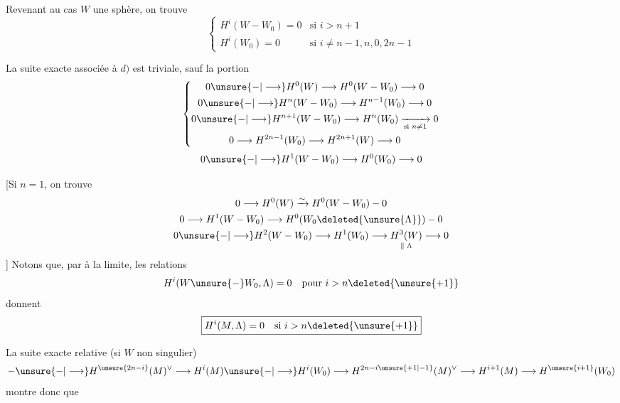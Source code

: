 Revenant au cas $W$ une sphère, on trouve
\[\left\{\begin{array}{ll}H^i(W-W_0)=0&\text{si }i>n+1\\H^i(W_0)=0&\text{si }i\ne n-1,n,0,2n-1\end{array}\right.\]
\margin{[en fait, si $i\ne\deleted{\unsure{n,n+1}}\deleted{\unsure{]}}0,1,n,n+1$]}
\margin{(d'abord si $i\ge n+1$ et $i\ne2n-1$, puis le reste par dualité]}

La suite exacte associée à $d)$ est triviale, sauf la portion
\[\left\{\begin{gathered}
0\unsure{\mathbin{-}|\longrightarrow}H^0(W)\longrightarrow H^0(W-W_0)\longrightarrow0\\
0\unsure{\mathbin{-}|\longrightarrow}H^n(W-W_0)\longrightarrow H^{n-1}(W_0)\longrightarrow0\\
0\unsure{\mathbin{-}|\longrightarrow}H^{n+1}(W-W_0)\longrightarrow H^n(W_0)\xrightarrow[\text{si }n\ne1]{}0\\
0\longrightarrow H^{2n-1}(W_0)\longrightarrow H^{2n+1}(W)\longrightarrow0
\end{gathered}\right.\]
\[0\unsure{\mathbin{-}|\longrightarrow}H^1(W-W_0)\longrightarrow H^0(W_0)\longrightarrow0\]
\deleted{\[\unsure{n+1\ne2n+1}\]}
\deleted{\[n+2\ne2n+1\]}

[Si $n=1$, on trouve
\[\begin{gathered}
0\longrightarrow H^0(W)\xrightarrow{\sim}H^0(W-W_0)\mathbin{-}0\\
0\longrightarrow H^1(W-W_0)\longrightarrow H^0(W_0\deleted{\unsure{\Lambda}})\mathbin{-}0\\
0\unsure{\mathbin{-}|\longrightarrow}H^2(W-W_0)\longrightarrow H^1(W_0)\longrightarrow\underset{\Vert\;\Lambda}{H^3(W)}\longrightarrow0
\end{gathered}\]
]
Notons que, par  à la limite,  les relations
\[H^i(W\unsure{-}W_0,\Lambda)=0\quad\text{pour }i>n\deleted{\unsure{+1}}\]
donnent
\[\boxed{H^i(M,\Lambda)=0\quad\text{si }i>n\deleted{\unsure{+1}}}\]

La suite exacte relative (si $W$ non singulier)
\[\mathbin{-}\unsure{\mathbin{-}|\longrightarrow}H^{\unsure{2n-i}}(M)^\vee\longrightarrow H^i(M)\unsure{\mathbin{-}|\longrightarrow}H^i(W_0)\longrightarrow H^{2n-i\unsure{+1|-1}}(M)^\vee\longrightarrow H^{i+1}(M)\longrightarrow H^{\unsure{i+1}}(W_0)\]
montre donc que

